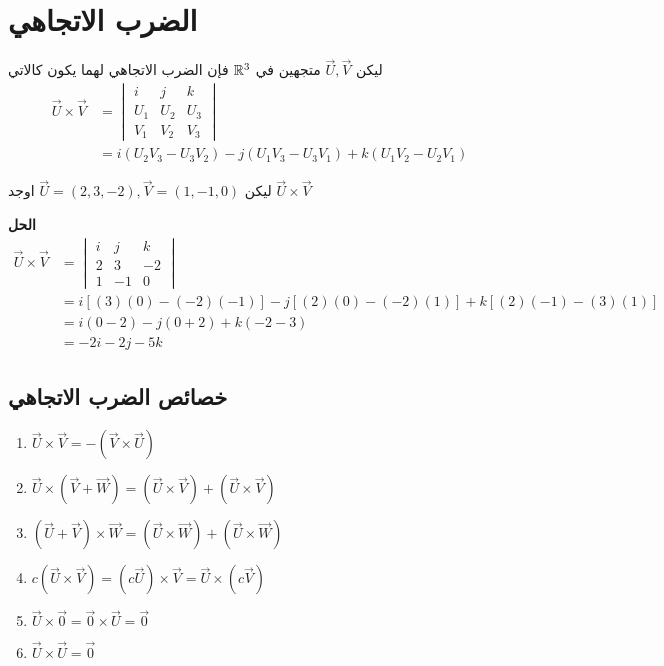 \section[الضرب الاتجاهي]{الضرب الاتجاهي \cite{key4}}
ليكن $\vec{U}, \vec{V}$ متجهين في $\mathbb{R}^3$ فإن الضرب الاتجاهي لهما يكون كالاتي
\begin{align*}
	\vec{U}\times\vec{V} & = 
	\begin{vmatrix}
		i & j & k\\
		U_1 & U_2 & U_3\\
		V_1 & V_2 & V_3
	\end{vmatrix}\\
	&= i(U_2V_3 - U_3V_2 ) -j(U_1V_3 - U_3V_1) + k(U_1V_2 - U_2V_1)
\end{align*}
\begin{example}
	ليكن
	$\vec{U} = (2,3,-2), \vec{V} = (1,-1,0)$ 
	اوجد $\vec{U}\times\vec{V}$
\end{example}
\noindent
\textbf{الحل}
\begin{align*}
	\vec{U}\times\vec{V} & = 
	\begin{vmatrix}
		i & j & k\\
		2 & 3 & -2\\
		1 & -1 & 0
	\end{vmatrix}\\
	&= i[(3)(0) - (-2)(-1)] -j[(2)(0) - (-2)(1)] + k[(2)(-1) -(3)(1)]\\
	&= i(0-2) - j(0+2) + k(-2-3)\\
	&= -2i -2j -5k
\end{align*}

\subsection*{خصائص الضرب الاتجاهي}
\begin{english}
	\begin{enumerate}
		\item $\vec{U}\times\vec{V} = -(\vec{V}\times\vec{U})$
		\item $\vec{U}\times(\vec{V} + \vec{W}) = (\vec{U}\times\vec{V}) + (\vec{U}\times\vec{V})$
		\item $(\vec{U}+\vec{V})\times\vec{W} = (\vec{U}\times\vec{W}) + (\vec{U}\times\vec{W})$
		\item $c(\vec{U}\times\vec{V}) = (c\vec{U})\times\vec{V} = \vec{U}\times(c
		\vec{V})$
		\item $\vec{U}\times\vec{0} = \vec{0}\times\vec{U} = \vec{0}$
		\item $\vec{U}\times\vec{U} = \vec{0}$
	\end{enumerate}
\end{english}
\noindent
